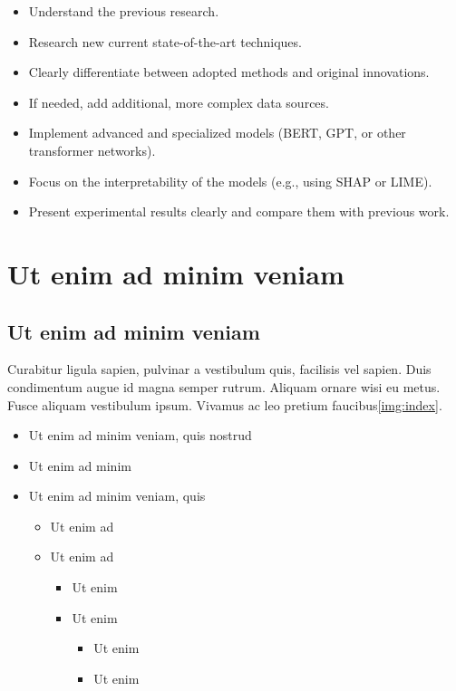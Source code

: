 \begin{itemize}
  \item Understand the previous research.
  \item Research new current state-of-the-art techniques.
  \item Clearly differentiate between adopted methods and original innovations.
  \item If needed, add additional, more complex data sources.
  \item Implement advanced and specialized models (BERT, GPT, or other transformer networks).
  \item Focus on the interpretability of the models (e.g., using SHAP or LIME).
  \item Present experimental results clearly and compare them with previous work.
\end{itemize}

\section{Ut enim ad minim veniam}

\lipsum[2-4]

\subsection{Ut enim ad minim veniam}

Curabitur ligula sapien, pulvinar a vestibulum quis, facilisis vel sapien. Duis condimentum augue id magna semper rutrum. Aliquam ornare wisi eu metus. Fusce aliquam vestibulum ipsum. Vivamus ac leo pretium faucibus\ref{img:index}.

\begin{itemize}
    \item Ut enim ad minim veniam, quis nostrud
    \item Ut enim ad minim 
    \item Ut enim ad minim veniam, quis 
    \begin{itemize}
        \item Ut enim ad
        \item Ut enim ad
        \begin{itemize}
            \item Ut enim 
            \item Ut enim 
            \begin{itemize}
            \item Ut enim 
            \item Ut enim 
        \end{itemize}
        \end{itemize}
    \end{itemize}
\end{itemize}

